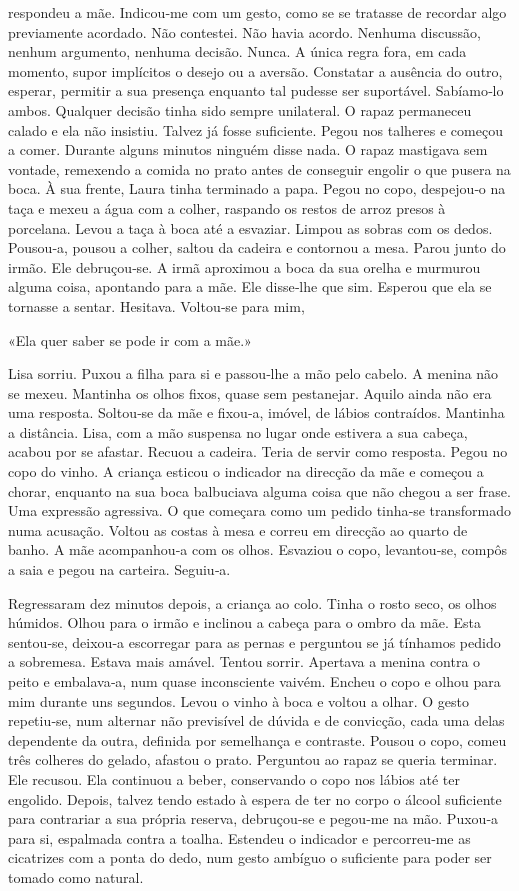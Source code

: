 respondeu a mãe. Indicou­‑me com um gesto, como se se tratasse de
recordar algo previamente acordado. Não contestei. Não havia acordo.
Nenhuma discussão, nenhum argumento, nenhuma decisão. Nunca. A única
regra fora, em cada momento, supor implícitos o desejo ou a aversão.
Constatar a ausência do outro, esperar, permitir a sua presença enquanto
tal pudesse ser suportável. Sabíamo­‑lo ambos. Qualquer decisão tinha
sido sempre unilateral. O rapaz permaneceu calado e ela não insistiu.
Talvez já fosse suficiente. Pegou nos talheres e começou a comer.
Durante alguns minutos ninguém disse nada. O rapaz mastigava sem
vontade, remexendo a comida no prato antes de conseguir engolir o que
pusera na boca. À sua frente, Laura tinha terminado a papa. Pegou no
copo, despejou­‑o na taça e mexeu a água com a colher, raspando os
restos de arroz presos à porcelana. Levou a taça à boca até a esvaziar.
Limpou as sobras com os dedos. Pousou­‑a, pousou a colher, saltou da
cadeira e contornou a mesa. Parou junto do irmão. Ele debruçou­‑se. A
irmã aproximou a boca da sua orelha e murmurou alguma coisa, apontando
para a mãe. Ele disse­‑lhe que sim. Esperou que ela se tornasse a
sentar. Hesitava. Voltou­‑se para mim,

«Ela quer saber se pode ir com a mãe.»

Lisa sorriu. Puxou a filha para si e passou­‑lhe a mão pelo cabelo. A
menina não se mexeu. Mantinha os olhos fixos, quase sem pestanejar.
Aquilo ainda não era uma resposta. Soltou­‑se da mãe e fixou­‑a, imóvel,
de lábios contraídos. Mantinha a distância. Lisa, com a mão suspensa no
lugar onde estivera a sua cabeça, acabou por se afastar. Recuou a
cadeira. Teria de servir como resposta. Pegou no copo do vinho. A
criança esticou o indicador na direcção da mãe e começou a chorar,
enquanto na sua boca balbuciava alguma coisa que não chegou a ser frase.
Uma expressão agressiva. O que começara como um pedido tinha­‑se
transformado numa acusação. Voltou as costas à mesa e correu em direcção
ao quarto de banho. A mãe acompanhou­‑a com os olhos. Esvaziou o copo,
levantou­‑se, compôs a saia e pegou na carteira. Seguiu­‑a.

Regressaram dez minutos depois, a criança ao colo. Tinha o rosto seco,
os olhos húmidos. Olhou para o irmão e inclinou a cabeça para o ombro da
mãe. Esta sentou­‑se, deixou­‑a escorregar para as pernas e perguntou se
já tínhamos pedido a sobremesa. Estava mais amável. Tentou sorrir.
Apertava a menina contra o peito e embalava­‑a, num quase inconsciente
vaivém. Encheu o copo e olhou para mim durante uns segundos. Levou o
vinho à boca e voltou a olhar. O gesto repetiu­‑se, num alternar não
previsível de dúvida e de convicção, cada uma delas dependente da outra,
definida por semelhança e contraste. Pousou o copo, comeu três colheres
do gelado, afastou o prato. Perguntou ao rapaz se queria terminar. Ele
recusou. Ela continuou a beber, conservando o copo nos lábios até ter
engolido. Depois, talvez tendo estado à espera de ter no corpo o álcool
suficiente para contrariar a sua própria reserva, debruçou­‑se e
pegou­‑me na mão. Puxou­‑a para si, espalmada contra a toalha. Estendeu
o indicador e percorreu­‑me as cicatrizes com a ponta do dedo, num gesto
ambíguo o suficiente para poder ser tomado como natural.

